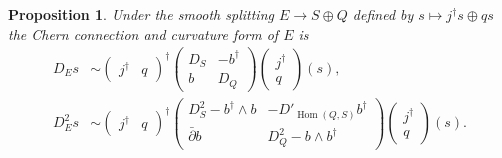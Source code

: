 \documentclass[10pt,a4paper]{article}
\newtheorem{prop}[theo]{Proposition}
\DeclareMathOperator{\Hom}{Hom}
\begin{document}
\begin{prop}
Under the smooth splitting $E \to S \oplus Q$ defined by $s \mapsto j^\dagger s \oplus qs$ the Chern connection and curvature form of $E$ is
\begin{align*}
D_E s &\sim
\begin{pmatrix}
j^\dagger & q
\end{pmatrix}^\dagger
\begin{pmatrix}
D_S & - b^\dagger
\\
b & D_Q
\end{pmatrix}
\begin{pmatrix}
j^\dagger \\ q
\end{pmatrix}
(s),
\\
D_E^2 s &\sim
\begin{pmatrix}
j^\dagger & q
\end{pmatrix}^\dagger
\begin{pmatrix}
D^2_S - b^\dagger \wedge b & -D'_{\Hom(Q,S)} b^\dagger
\\
\bar\partial b & D^2_Q - b \wedge b^\dagger
\end{pmatrix}
\begin{pmatrix}
  j^\dagger \\ q
\end{pmatrix}(s).
\end{align*}
\end{prop}
\end{document}
